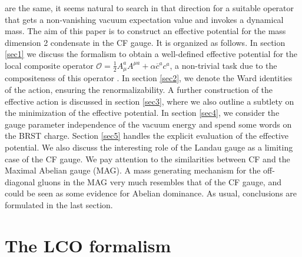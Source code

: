 \documentclass[a4paper,12pt]{article}
\newcommand{\sect}[1]{ \section{#1} \setcounter{equation}{0} }
\begin{document}
\cite{Kondo:2001nq,kmsi,Delbourgo:1981cm,Baulieu:sb} are the same,
it seems natural to search in that direction for a suitable
operator that gets a non-vanishing vacuum expectation value and
invokes a dynamical mass.
\newline
\newline
The aim of this paper is to construct an effective potential for the mass
dimension 2 condensate in the CF gauge. It is organized as follows. In
section \ref{sec1} we discuss the formalism to obtain a well-defined
effective potential for the local composite operator $\mathcal{O}=\frac{1}{2}%
A_{\mu}^{a}A^{\mu a}+\alpha \overline{c}^{a}c^{a}$, a non-trivial
task due to the compositeness of this operator \cite{v1,
Knecht:2001cc}. In section \ref{sec2}, we denote the Ward
identities of the action, ensuring the renormalizability. A
further construction of the effective action is discussed in
section \ref{sec3}, where we also outline a subtlety on the
minimization of the effective potential. In section \ref{sec4}, we
consider the gauge parameter independence of the vacuum energy and
spend some words on the BRST charge. Section \ref{sec5} handles
the explicit evaluation of the effective potential. We also
discuss the interesting role of the Landau gauge as a limiting
case of the CF gauge. We pay attention to the similarities between
CF and the Maximal Abelian gauge (MAG). A mass generating
mechanism for the off-diagonal gluons in the MAG very much
resembles that of the CF gauge, and could be seen as some evidence
for Abelian dominance. As usual, conclusions are formulated in the
last section.

\sect{The LCO formalism}
\end{document}
